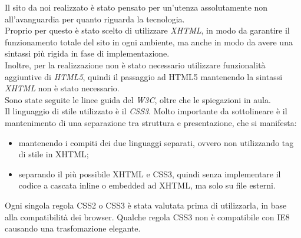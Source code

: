Il sito da noi realizzato è stato pensato per un'utenza assolutamente non all'avanguardia per quanto riguarda la tecnologia.\\
Proprio per questo è stato scelto di utilizzare \emph{XHTML}, in modo da garantire il funzionamento totale del sito in ogni ambiente, ma anche in modo da
avere una sintassi più rigida in fase di implementazione.\\ Inoltre, per la realizzazione non è stato necessario utilizzare funzionalità aggiuntive
di \emph{HTML5}, quindi il passaggio ad HTML5 mantenendo la sintassi \emph{XHTML} non è stato necessario.\\
Sono state seguite le linee guida del \emph{W3C}, oltre che le spiegazioni in aula.\\
Il linguaggio di stile utilizzato è il \emph{CSS3}. Molto importante da sottolineare è il mantenimento di una separazione tra struttura e presentazione, che 
si manifesta: 
\begin{itemize}
    \item mantenendo i compiti dei due linguaggi separati, ovvero non utilizzando tag di stile in XHTML;
    \item separando il più possibile XHTML e CSS3, quindi senza implementare il codice a cascata inline o embedded ad XHTML, ma solo su file esterni.
\end{itemize}
Ogni singola regola CSS2 o CSS3 è stata valutata prima di utilizzarla, in base alla compatibilità dei browser.
Qualche regola CSS3 non è compatibile con IE8 causando una trasfomazione elegante.


